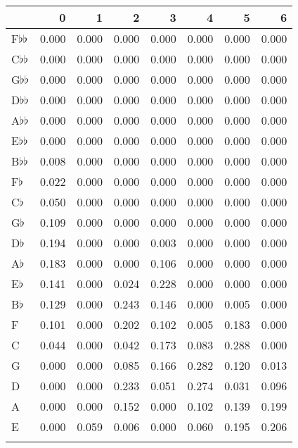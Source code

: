 \begin{tabular}{lrrrrrrr}
\toprule
{} &      0 &      1 &      2 &      3 &      4 &      5 &      6 \\
\midrule
F$\flat$$\flat$   &  0.000 &  0.000 &  0.000 &  0.000 &  0.000 &  0.000 &  0.000 \\
C$\flat$$\flat$   &  0.000 &  0.000 &  0.000 &  0.000 &  0.000 &  0.000 &  0.000 \\
G$\flat$$\flat$   &  0.000 &  0.000 &  0.000 &  0.000 &  0.000 &  0.000 &  0.000 \\
D$\flat$$\flat$   &  0.000 &  0.000 &  0.000 &  0.000 &  0.000 &  0.000 &  0.000 \\
A$\flat$$\flat$   &  0.000 &  0.000 &  0.000 &  0.000 &  0.000 &  0.000 &  0.000 \\
E$\flat$$\flat$   &  0.000 &  0.000 &  0.000 &  0.000 &  0.000 &  0.000 &  0.000 \\
B$\flat$$\flat$   &  0.008 &  0.000 &  0.000 &  0.000 &  0.000 &  0.000 &  0.000 \\
F$\flat$          &  0.022 &  0.000 &  0.000 &  0.000 &  0.000 &  0.000 &  0.000 \\
C$\flat$          &  0.050 &  0.000 &  0.000 &  0.000 &  0.000 &  0.000 &  0.000 \\
G$\flat$          &  0.109 &  0.000 &  0.000 &  0.000 &  0.000 &  0.000 &  0.000 \\
D$\flat$          &  0.194 &  0.000 &  0.000 &  0.003 &  0.000 &  0.000 &  0.000 \\
A$\flat$          &  0.183 &  0.000 &  0.000 &  0.106 &  0.000 &  0.000 &  0.000 \\
E$\flat$          &  0.141 &  0.000 &  0.024 &  0.228 &  0.000 &  0.000 &  0.000 \\
B$\flat$          &  0.129 &  0.000 &  0.243 &  0.146 &  0.000 &  0.005 &  0.000 \\
F                 &  0.101 &  0.000 &  0.202 &  0.102 &  0.005 &  0.183 &  0.000 \\
C                 &  0.044 &  0.000 &  0.042 &  0.173 &  0.083 &  0.288 &  0.000 \\
G                 &  0.000 &  0.000 &  0.085 &  0.166 &  0.282 &  0.120 &  0.013 \\
D                 &  0.000 &  0.000 &  0.233 &  0.051 &  0.274 &  0.031 &  0.096 \\
A                 &  0.000 &  0.000 &  0.152 &  0.000 &  0.102 &  0.139 &  0.199 \\
E                 &  0.000 &  0.059 &  0.006 &  0.000 &  0.060 &  0.195 &  0.206 \\
$$
\end{tabular}
